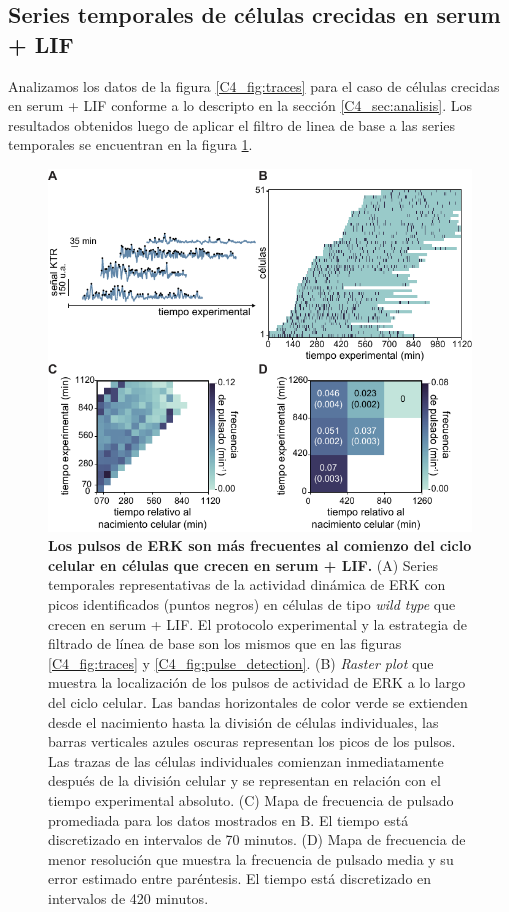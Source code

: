 \documentclass[./main.tex]{subfiles}
\begin{document}
\begin{subappendices}
\section{Series temporales de células crecidas en serum + LIF}
\label{C4_ap:s+L_cell_cycle}

Analizamos los datos de la figura \ref{C4_fig:traces} para el caso de células crecidas en serum + LIF conforme a lo descripto en la sección \ref{C4_sec:analisis}. Los resultados obtenidos luego de aplicar el filtro de linea de base a las series temporales se encuentran en la figura \ref{C4_fig:s+L_cell_cycle}.


\begin{figure}
    \centering
    \includegraphics[width=1\columnwidth]{figures/chapter4/C4_s+L_cell_cycle.pdf}\caption{\textbf{ Los pulsos de ERK son más frecuentes al comienzo del ciclo celular en células que crecen en serum + LIF.} (A) Series temporales representativas de la actividad dinámica de ERK con picos identificados (puntos negros) en células de tipo \textit{wild type} que crecen en serum + LIF. El protocolo experimental y la estrategia de filtrado de línea de base son los mismos que en las figuras \ref{C4_fig:traces} y \ref{C4_fig:pulse_detection}. (B) \textit{Raster plot} que muestra la localización de los pulsos de actividad de ERK a lo largo del ciclo celular. Las bandas horizontales de color verde se extienden desde el nacimiento hasta la división de células individuales, las barras verticales azules oscuras representan los picos de los pulsos. Las trazas de las células individuales comienzan inmediatamente después de la división celular y se representan en relación con el tiempo experimental absoluto. (C) Mapa de frecuencia de pulsado promediada para los datos mostrados en B. El tiempo está discretizado en intervalos de 70 minutos. (D) Mapa de frecuencia de menor resolución que muestra la frecuencia de pulsado media y su error estimado entre paréntesis. El tiempo está discretizado en intervalos de 420 minutos.}
    \label{C4_fig:s+L_cell_cycle}
\end{figure}



\end{subappendices}
\end{document}
